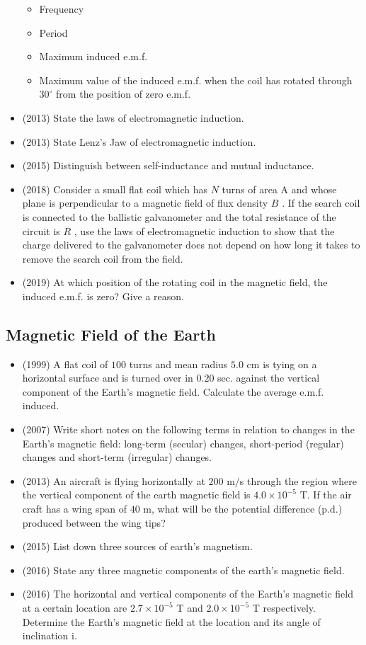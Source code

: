 \documentclass{article}
\begin{document}
\begin{itemize}
\begin{itemize}
\item Frequency
\item Period
\item Maximum induced e.m.f.
\item Maximum value of the induced e.m.f. when the coil has rotated through $ 30^{\circ}$ from the position of zero e.m.f.
\end{itemize}
\item (2013)  State the laws of electromagnetic induction.
\item (2013)  State Lenz’s Jaw of electromagnetic induction.
\item (2015)  Distinguish between self-inductance and mutual inductance.
\item (2018)  Consider a small flat coil which has $ N$ turns of area A and whose plane is perpendicular to a magnetic field of flux density $ B$ . If the search coil is connected to the ballistic galvanometer and the total resistance of the circuit is $ R$ , use the laws of electromagnetic induction to show that the charge delivered to the galvanometer does not depend on how long it takes to remove the search coil from the field. 
\item (2019)  At which position of the rotating coil in the magnetic field, the induced e.m.f. is zero? Give a reason. 
\end{itemize}

\subsection{Magnetic Field of the Earth}
\begin{itemize}
\item (1999)  A flat coil of $ 100$ turns and mean radius $ 5.0$ cm is tying on a horizontal surface and is turned over in $ 0.20$ sec. against the vertical component of the Earth's magnetic field. Calculate the average e.m.f. induced.
\item (2007)  Write short notes on the following terms in relation to changes in the Earth's magnetic field:  long-term (secular) changes, short-period (regular) changes and short-term (irregular) changes.
\item (2013)  An aircraft is flying horizontally at $ 200$ m$/$s through the region where the vertical component of the earth magnetic field is $ 4.0 \times 10^{-5}$ T. If the air craft has a wing span of $ 40$ m, what will be the potential difference (p.d.) produced between the wing tips? 
\item (2015)  List down three sources of earth's magnetism. 
\item (2016)  State any three magnetic components of the earth’s magnetic field.
\item (2016)  The horizontal and vertical components of the Earth’s magnetic field at a certain location are $ 2.7 \times 10^{-5}$ T and $ 2.0 \times 10^{-5}$ T respectively.  Determine the Earth’s magnetic field at the location and its angle of inclination i.
\end{itemize}
\end{document}

